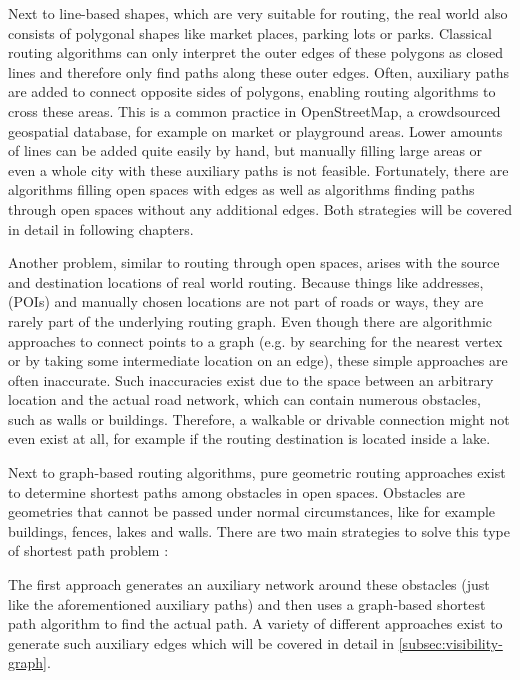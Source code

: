 	Next to line-based shapes, which are very suitable for routing, the real world also consists of polygonal shapes like market places, parking lots or parks.
	Classical routing algorithms can only interpret the outer edges of these polygons as closed lines and therefore only find paths along these outer edges.
	Often, auxiliary paths are added to connect opposite sides of polygons, enabling routing algorithms to cross these areas.
	This is a common practice in OpenStreetMap, a crowdsourced geospatial database, for example on market or playground areas.
	Lower amounts of lines can be added quite easily by hand, but manually filling large areas or even a whole city with these auxiliary paths is not feasible.
	Fortunately, there are algorithms filling open spaces with edges as well as algorithms finding paths through open spaces without any additional edges.
	Both strategies will be covered in detail in following chapters.
	
	Another problem, similar to routing through open spaces, arises with the source and destination locations of real world routing.
	Because things like addresses,  (POIs) and manually chosen locations are not part of roads or ways, they are rarely part of the underlying routing graph.
	Even though there are algorithmic approaches to connect points to a graph (e.g. by searching for the nearest vertex or by taking some intermediate location on an edge), these simple approaches are often inaccurate.
	Such inaccuracies exist due to the space between an arbitrary location and the actual road network, which can contain numerous obstacles, such as walls or buildings.
	Therefore, a walkable or drivable connection might not even exist at all, for example if the routing destination is located inside a lake.
	
	Next to graph-based routing algorithms, pure geometric routing approaches exist to determine shortest paths among obstacles in open spaces.
	Obstacles are geometries that cannot be passed under normal circumstances, like for example buildings, fences, lakes and walls.
	There are two main strategies to solve this type of shortest path problem \cite{hershberger-suri}:
	
	The first approach generates an auxiliary network around these obstacles (just like the aforementioned auxiliary paths) and then uses a graph-based shortest path algorithm to find the actual path.
	A variety of different approaches exist to generate such auxiliary edges\cite{graser-osm-open-spaces} which will be covered in detail in \cref{subsec:visibility-graph}.
	
